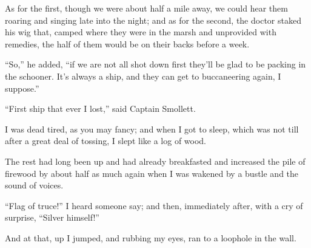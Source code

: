 As for the first, though we were about half a mile away, we could hear them roaring and singing late into the night; and as for the second, the doctor staked his wig that, camped where they were in the marsh and unprovided with remedies, the half of them would be on their backs before a week.

\enquote{So,} he added, \enquote{if we are not all shot down first they’ll be glad to be packing in the schooner. It’s always a ship, and they can get to buccaneering again, I suppose.}

\enquote{First ship that ever I lost,} said Captain Smollett.

I was dead tired, as you may fancy; and when I got to sleep, which was not till after a great deal of tossing, I slept like a log of wood.

The rest had long been up and had already breakfasted and increased the pile of firewood by about half as much again when I was wakened by a bustle and the sound of voices.

\enquote{Flag of truce!} I heard someone say; and then, immediately after, with a cry of surprise, \enquote{Silver himself!}

And at that, up I jumped, and rubbing my eyes, ran to a loophole in the wall.